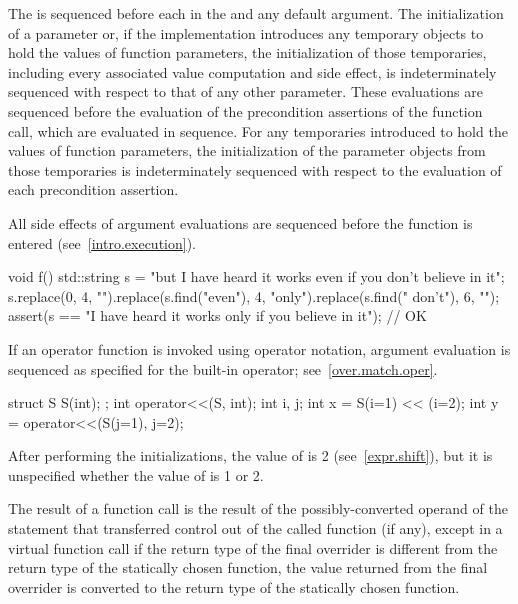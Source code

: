 \pnum
{}%
%
%
The  is sequenced before
each  in the 
and any default argument.
The initialization of a parameter or,
if the implementation introduces any temporary objects
to hold the values of function parameters,
the initialization of those temporaries,
including every associated value computation and side effect,
is indeterminately sequenced with respect to that of any other parameter.
These evaluations are
sequenced before
the evaluation of the precondition assertions of the function call,
which are evaluated in sequence.
For any temporaries
introduced to hold the values of function parameters,
the initialization of the parameter objects from those temporaries
is indeterminately sequenced with respect to
the evaluation of each precondition assertion.
\begin{note}
All side effects of
argument evaluations are sequenced before the function is
entered (see~\ref{intro.execution}).
\end{note}
\begin{example}
\begin{codeblock}
void f() {
  std::string s = "but I have heard it works even if you don't believe in it";
  s.replace(0, 4, "").replace(s.find("even"), 4, "only").replace(s.find(" don't"), 6, "");
  assert(s == "I have heard it works only if you believe in it");       // OK
}
\end{codeblock}
\end{example}
\begin{note}
If an operator function is invoked
using operator notation,
argument evaluation is sequenced
as specified for the built-in operator;
see~\ref{over.match.oper}.
\end{note}
\begin{example}
\begin{codeblock}
struct S {
  S(int);
};
int operator<<(S, int);
int i, j;
int x = S(i=1) << (i=2);
int y = operator<<(S(j=1), j=2);
\end{codeblock}
After performing the initializations,
the value of  is 2 (see~\ref{expr.shift}),
but it is unspecified whether the value of  is 1 or 2.
\end{example}

\pnum
The result of a function call is the result of the possibly-converted operand
of the  statement
that transferred control out of the called function (if any),
except in a virtual function call if the return type of the
final overrider is different from the return type of the statically
chosen function, the value returned from the final overrider is
converted to the return type of the statically chosen function.

